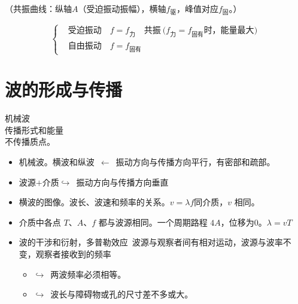 （共振曲线：纵轴$A$（受迫振动振幅），横轴$f_{\text{驱}}$，峰值对应$f_{\text{固}}$。）

\[
\left\{\begin{aligned}
&\text{受迫振动}\quad f=f_{\text{力}}\quad\text{共振}\ \bigl(f_{\text{力}}=f_{\text{固有}}\text{时，能量最大}\bigr)\\
&\text{自由振动}\quad f=f_{\text{固有}}
\end{aligned}\right.
\]


\section{波的形成与传播}
机械波\\
传播形式和能量\\
不传播质点。
\begin{itemize}
\item 机械波。横波和纵波\ $\leftarrow$\ 振动方向与传播方向平行，有密部和疏部。
\item 波源$+$介质\quad $\hookrightarrow$\ 振动方向与传播方向垂直
\item 横波的图像。波长、波速和频率的关系。\quad $v=\lambda f$\quad 同介质，$v$ 相同。
\item 介质中各点 $T$、$A$、$f$ 都与波源相同。一个周期路程 $4A$，位移为0。\quad $\lambda=vT$
\item 波的干涉和衍射，多普勒效应\ 波源与观察者间有相对运动，波源与波率不变，观察者接收到的频率
  \begin{itemize}
  \item $\hookrightarrow$\ 两波频率必须相等。
  \item $\hookrightarrow$\ 波长与障碍物或孔的尺寸差不多或大。
  \end{itemize}
\end{itemize}

